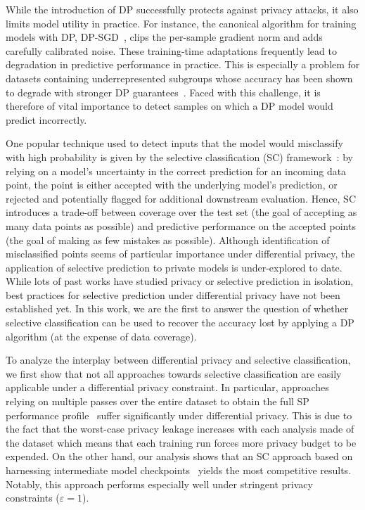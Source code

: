 While the introduction of DP successfully protects against privacy attacks, it also limits model utility in practice. For instance, the canonical algorithm for training models with DP, DP-SGD~\citep{abadi2016deep}, clips the per-sample gradient norm and adds carefully calibrated noise. These training-time adaptations frequently lead to degradation in predictive performance in practice. This is especially a problem for datasets containing underrepresented subgroups whose accuracy has been shown to degrade with stronger DP guarantees~\citep{bagdasaryan2019differential}. Faced with this challenge, it is therefore of vital importance to detect samples on which a DP model would predict incorrectly.

One popular technique used to detect inputs that the model would misclassify with high probability is given by the selective classification (SC) framework~\citep{geifman2017selective}: by relying on a model's uncertainty in the correct prediction for an incoming data point, the point is either accepted with the underlying model's prediction, or rejected and potentially flagged for additional downstream evaluation. Hence, SC introduces a trade-off between coverage over the test set (\ie the goal of accepting as many data points as possible) and predictive performance on the accepted points (\ie the goal of making as few mistakes as possible). Although identification of misclassified points seems of particular importance under differential privacy, the application of selective prediction to private models is under-explored to date. While lots of past works have studied privacy or selective prediction in isolation, best practices for selective prediction under differential privacy have not been established yet. In this work, we are the first to answer the question of whether selective classification can be used to recover the accuracy lost by applying a DP algorithm (at the expense of data coverage).

To analyze the interplay between differential privacy and selective classification, we first show that not all approaches towards selective classification are easily applicable under a differential privacy constraint. In particular, approaches relying on multiple passes over the entire dataset to obtain the full SP performance profile~\citep{geifman2019selectivenet, lakshminarayanan2017simple} suffer significantly under differential privacy. This is due to the fact that the worst-case privacy leakage increases with each analysis made of the dataset which means that each training run forces more privacy budget to be expended. On the other hand, our analysis shows that an SC approach based on harnessing intermediate model checkpoints~\citep{rabanser2022selective} yields the most competitive results. Notably, this approach performs especially well under stringent privacy constraints ($\varepsilon = 1$). 

